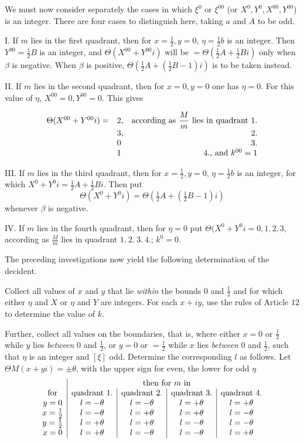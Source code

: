 We must now consider separately the cases in which $\xi^0$ or $\xi^{00}$ (or $X^0,Y^0,X^{00},Y^{00}$) is an integer. There are four cases to distinguish here, taking $a$ and $A$ to be odd.

I. If $m$ lies in the first quadrant, then for $x=\frac12,y=0$, $\eta=\frac12b$ is an integer. Then $Y^{00}=\frac12B$ is an integer, and $\Theta(X^{00}+Y^{00}i)$ will be $=\Theta(\frac12A+\frac12Bi)$ only when $\beta$ is negative. When $\beta$ is positive, $\Theta(\frac12A+(\frac12B-1)i)$ is to be taken instead.

II. If $m$ lies in the second quadrant, then for $x=0,y=0$ one has $\eta=0$. For this value of $\eta$, $X^{00}=0,Y^{00}=0$. This gives

\[
\begin{array}{rll}
\Theta(X^{00}+Y^{00}i)=&2,&\text{according as }\dfrac{M}{m}\text{ lies in quadrant }1.\\
&3,&\hfill2.\\
&0&\hfill3.\\
&1&\hfill4.\text{, and }k^{00}=1
\end{array}
\]

III. If $m$ lies in the third quadrant, then for $x=\frac12,y=0$, $\eta=\frac12b$ is an integer, for which $X^0+Y^0i=\frac12A+\frac12Bi$. Then put
\[
\Theta(X^0+Y^0i)=\Theta(\tfrac12A+(\tfrac12B-1)i)
\]
whenever $\beta$ is negative.

IV. If $m$ lies in the fourth quadrant, then for $\eta=0$ put
$\Theta(X^0+Y^0i=0,1,2,3$, according as $\frac{M}{m}$ lies in quadrant $1.\ 2.\ 3.\ 4.$;
$k^0=0$.

The preceding investigations now yield the following determination of the decident.

Collect all values of $x$ and $y$ that lie \emph{within} the bounds $0$ and $\frac12$ and for which either $\eta$ and $X$ or $\eta$ and $Y$ are integers. For each $x+iy$, use the rules of Article $12$ to determine the value of $k$.

Further, collect all values on the boundaries, that is, where either $x=0$ or $\frac12$ while $y$ lies \emph{between} $0$ and $\frac12$, or $y=0$ or $=\frac12$ while $x$ lies \emph{between} $0$ and $\frac12$, such that $\eta$ is an integer and $[\xi]$ odd. Determine the corresponding $l$ as follows. Let $\Theta M(x+yi)=\pm\theta$, with the upper sign for even, the lower for odd $\eta$
\[
\begin{array}{c|c|c|c|c}
&\multicolumn{4}{c}{\text{then for }m\text{ in}}\\
\text{for}&\text{quadrant }1.&\text{quadrant }2.&\text{quadrant }3.&\text{quadrant }4.\\
y=0&l=-\theta&l=-\theta&l=+\theta&l=+\theta\\
x=\frac12&l=-\theta&l=+\theta&l=+\theta&l=-\theta\\
y=\frac12&l=+\theta&l=+\theta&l=-\theta&l=-\theta\\
x=0&l=+\theta&l=-\theta&l=-\theta&l=+\theta
\end{array}
\]

